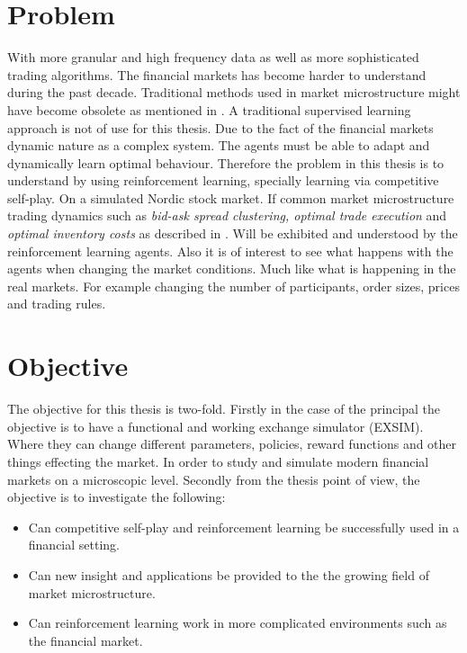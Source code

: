 \documentclass{kththesis}
\theoremstyle{definition}
\begin{document}
\section{Problem}
With more granular and high frequency data as well as more sophisticated trading algorithms. The financial markets has become harder to understand during the past decade. Traditional methods used in market microstructure might have become obsolete as mentioned in \textcite{o2015high}. A traditional supervised learning approach is not of use for this thesis. Due to the fact of the financial markets dynamic nature as a complex system. The agents must be able to adapt and dynamically learn optimal behaviour.  Therefore the problem in this thesis is to understand by using reinforcement learning, specially learning via competitive self-play. On a simulated Nordic stock market. 
\newline
\newline
If common market microstructure trading dynamics such as \textit{bid-ask spread clustering, optimal trade execution} and \textit{optimal inventory costs} as described in \textcite{o1995market}. Will be exhibited and understood by the reinforcement learning agents. Also it is of interest to see what happens with the agents when changing the market conditions. Much like what is happening in the real markets. For example changing the number of participants, order sizes, prices and trading rules.



\section{Objective}
The objective for this thesis is two-fold. Firstly in the case of the principal the objective is to have a functional and working exchange simulator (EXSIM). Where they can change different parameters, policies, reward functions and other things effecting the market. In order to study and simulate modern financial markets on a microscopic level. Secondly from the thesis point of view, the objective is to investigate the following:

\begin{itemize}
    \item Can competitive self-play and reinforcement learning be successfully used in a financial setting. 
    \item Can new insight and applications be provided to the the growing field of market microstructure. 
    \item Can reinforcement learning work in more complicated environments such as the financial market.
\end{itemize}
\end{document}

